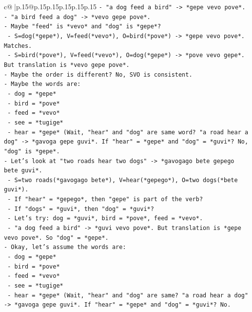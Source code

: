 \documentclass{article}
\begin{document}
{\begin{supertabular}{c@{$\;$}|p{.15\linewidth}@{}p{.15\linewidth}p{.15\linewidth}p{.15\linewidth}p{.15\linewidth}p{.15\linewidth}}
{{{\texttt{{-} "a dog feed a bird" {-}> *gepe vevo pove*.} \\
\texttt{{-} "a bird feed a dog" {-}> *vevo gepe pove*.} \\
\texttt{{-} Maybe "feed" is *vevo* and "dog" is *gepe*?} \\
\texttt{  {-} S=dog(*gepe*), V=feed(*vevo*), O=bird(*pove*) {-}> *gepe vevo pove*. Matches.} \\
\texttt{  {-} S=bird(*pove*), V=feed(*vevo*), O=dog(*gepe*) {-}> *pove vevo gepe*. But translation is *vevo gepe pove*.} \\
\texttt{{-} Maybe the order is different? No, SVO is consistent.} \\
\texttt{{-} Maybe the words are:} \\
\texttt{  {-} dog = *gepe*} \\
\texttt{  {-} bird = *pove*} \\
\texttt{  {-} feed = *vevo*} \\
\texttt{  {-} see = *tugige*} \\
\texttt{  {-} hear = *gepe* (Wait, "hear" and "dog" are same word? "a road hear a dog" {-}> *gavoga gepe guvi*. If "hear" = *gepe* and "dog" = *guvi*? No, "dog" is *gepe*.} \\
\texttt{{-} Let's look at "two roads hear two dogs" {-}> *gavogago bete gepego bete guvi*.} \\
\texttt{  {-} S=two roads(*gavogago bete*), V=hear(*gepego*), O=two dogs(*bete guvi*).} \\
\texttt{  {-} If "hear" = *gepego*, then "gepe" is part of the verb?} \\
\texttt{  {-} If "dogs" = *guvi*, then "dog" = *guvi*?} \\
\texttt{  {-} Let's try: dog = *guvi*, bird = *pove*, feed = *vevo*.} \\
\texttt{  {-} "a dog feed a bird" {-}> *guvi vevo pove*. But translation is *gepe vevo pove*. So "dog" = *gepe*.} \\
\texttt{{-} Okay, let's assume the words are:} \\
\texttt{  {-} dog = *gepe*} \\
\texttt{  {-} bird = *pove*} \\
\texttt{  {-} feed = *vevo*} \\
\texttt{  {-} see = *tugige*} \\
\texttt{  {-} hear = *gepe* (Wait, "hear" and "dog" are same? "a road hear a dog" {-}> *gavoga gepe guvi*. If "hear" = *gepe* and "dog" = *guvi*? No.} \\
}}}
\end{supertabular}}
\end{document}
